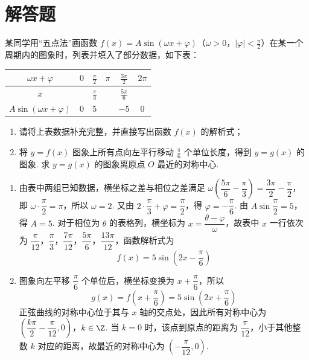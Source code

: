 \section{解答题}

\begin{problem}
某同学用“五点法”画函数 \(f(x)=A\sin(\omega x+\varphi)\)（\(\omega>0\)，\(|\varphi|<\frac{\pi}{2}\)）在某一个周期内的图象时，列表并填入了部分数据，如下表：

\begin{center}
\renewcommand{\arraystretch}{1.25}
\begin{tabular}{|c|c|c|c|c|c|}
\hline
\(\omega x+\varphi\) & \(0\) & \(\frac{\pi}{2}\) & \(\pi\) & \(\frac{3\pi}{2}\) & \(2\pi\) \\
\hline
\(x\) &  & \(\frac{\pi}{3}\) &  & \(\frac{5\pi}{6}\) &  \\
\hline
\(A\sin(\omega x+\varphi)\) & \(0\) & \(5\) &  & \(-5\) & \(0\) \\
\hline
\end{tabular}
\end{center}

\begin{enumerate}
\item 请将上表数据补充完整，并直接写出函数 \(f(x)\) 的解析式；
\item 将 \(y=f(x)\) 图象上所有点向左平行移动 \(\frac{\pi}{6}\) 个单位长度，得到 \(y=g(x)\) 的图象. 求 \(y=g(x)\) 的图象离原点 \(O\) 最近的对称中心.
\end{enumerate}
\end{problem}

\begin{solution}
\begin{enumerate}
\item 由表中两组已知数据，横坐标之差与相位之差满足
\(\omega\left(\dfrac{5\pi}{6}-\dfrac{\pi}{3}\right)=\dfrac{3\pi}{2}-\dfrac{\pi}{2}\)，即 \(\omega\cdot\dfrac{\pi}{2}=\pi\)，所以 \(\omega=2\). 又由 \(2\cdot\dfrac{\pi}{3}+\varphi=\dfrac{\pi}{2}\)，得 \(\varphi=-\dfrac{\pi}{6}\). 由 \(A\sin\dfrac{\pi}{2}=5\)，得 \(A=5\). 对于相位为 \(\theta\) 的表格列，横坐标为 \(x=\dfrac{\theta-\varphi}{\omega}\)，故表中 \(x\) 一行依次为 \(\dfrac{\pi}{12}\)，\(\dfrac{\pi}{3}\)，\(\dfrac{7\pi}{12}\)，\(\dfrac{5\pi}{6}\)，\(\dfrac{13\pi}{12}\)，函数解析式为
\[
f(x)=5\sin\left(2x-\dfrac{\pi}{6}\right)
\]

\item 图象向左平移 \(\dfrac{\pi}{6}\) 个单位后，横坐标变换为 \(x+\dfrac{\pi}{6}\)，所以
\[
g(x)=f\left(x+\dfrac{\pi}{6}\right)=5\sin\left(2x+\dfrac{\pi}{6}\right)
\]
正弦曲线的对称中心位于其与 \(x\) 轴的交点处，因此所有对称中心为
\(\left(\dfrac{k\pi}{2}-\dfrac{\pi}{12},0\right)\)，\(k\in\Z\).
当 \(k=0\) 时，该点到原点的距离为 \(\dfrac{\pi}{12}\)，小于其他整数 \(k\) 对应的距离，故最近的对称中心为 \(\left(-\dfrac{\pi}{12},0\right)\).
\end{enumerate}
\end{solution}

